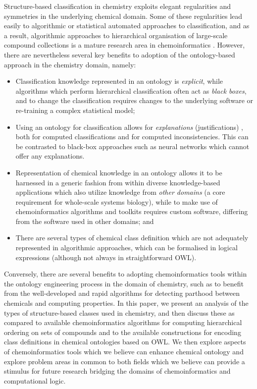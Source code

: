 \documentclass[10pt]{bmc_article}
\newenvironment{bmcformat}{\baselineskip20pt\sloppy\setboolean{publ}{false}}{\baselineskip20pt\sloppy}
\begin{document}
\begin{bmcformat}
Structure-based classification in chemistry exploits elegant regularities and symmetries in the underlying chemical domain.  Some of these regularities lead easily to algorithmic or statistical automated approaches to classification, and as a result, algorithmic approaches to hierarchical organisation of large-scale compound collections is a mature research area in chemoinformatics \cite{barnard1992,deshpande2005}. However, there are nevertheless several key benefits to adoption of the ontology-based approach in the chemistry domain, namely:
\begin{itemize}
	\item Classification knowledge represented in an ontology is \textit{explicit}, while algorithms which perform hierarchical classification often act as \textit{black boxes}, and to change the classification requires changes to the underlying software or re-training a complex statistical model;
	\item Using an ontology for classification allows for \textit{explanations} (justifications) \cite{horridgeentail09}, both for computed classifications and for computed inconsistencies. This can be contrasted to black-box approaches such as neural networks which cannot offer any explanations. 
	\item Representation of chemical knowledge in an ontology allows it to be harnessed in a generic fashion from within diverse knowledge-based applications which also utilize knowledge from \textit{other domains} (a core requirement for whole-scale systems biology), while to make use of chemoinformatics algorithms and toolkits requires custom software, differing from the software used in other domains; and
	\item There are several types of chemical class definition which are not adequately represented in algorithmic approaches, which can be formalised in logical expressions (although not always in straightforward OWL). 
\end{itemize}

Conversely, there are several benefits to adopting chemoinformatics tools within the ontology engineering process in the domain of chemistry, such as to benefit from the well-developed and rapid algorithms for detecting parthood between chemicals and computing properties.  In this paper, we present an analysis of the types of structure-based classes used in chemistry, and then discuss these as compared to available chemoinformatics algorithms for computing hierarchical ordering on sets of compounds and to the available constructions for encoding class definitions in chemical ontologies based on OWL.  We then explore aspects of chemoinformatics tools which we believe can enhance chemical ontology and explore problem areas in common to both fields which we believe can provide a stimulus for future research bridging the domains of chemoinformatics and computational logic. 


\end{bmcformat}
\end{document}
